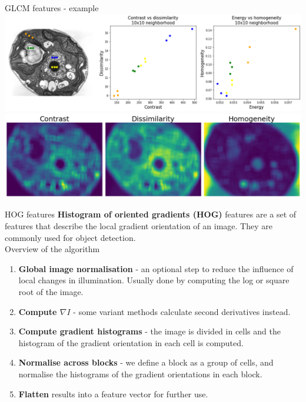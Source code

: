 \documentclass[9pt, aspectratio=169]{beamer}
\begin{document}
\begin{frame}
    {GLCM features - example}
    \centering
    \includegraphics[height=.5\textheight]{glcm_features.png}
    \pause
    \includegraphics[height=.4\textheight]{glcm_features_b.png}
\end{frame}
\begin{frame}
    {HOG features}
    \textbf{Histogram of oriented gradients (HOG)} features are a set of features that describe the local gradient orientation of an image. They are commonly used for object detection.\\

    \vspace{2em}
    Overview of the algorithm
    \begin{enumerate}[<+->]
        \item \textbf{Global image normalisation} - an optional step to reduce the influence of local changes in illumination. Usually done by computing the log or square root of the image.
        \item \textbf{Compute $\nabla I$} - some variant methods calculate second derivatives instead.
        \item \textbf{Compute gradient histograms} - the image is divided in cells and the histogram of the gradient orientation in each cell is computed.
        \item \textbf{Normalise across blocks} - we define a block as a group of cells, and normalise the histograms of the gradient orientations in each block.
        \item \textbf{Flatten} results into a feature vector for further use.
    \end{enumerate}
\end{frame}
\end{document}
